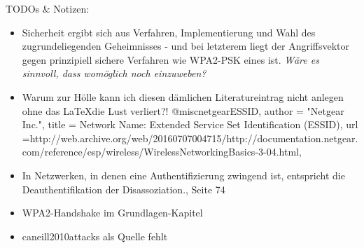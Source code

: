TODOs \& Notizen:
\begin{itemize}
	\item Sicherheit ergibt sich aus Verfahren, Implementierung und Wahl des zugrundeliegenden Geheimnisses - und bei letzterem liegt der Angriffsvektor gegen prinzipiell sichere Verfahren wie WPA2-PSK eines ist. \textit{Wäre es sinnvoll, dass womöglich noch einzuweben?}
	\item Warum zur Hölle kann ich diesen dämlichen Literatureintrag nicht anlegen ohne das \LaTeX die Lust verliert?! @misc{netgearESSID,
		author = "Netgear Inc.",
		title = {Network Name: Extended Service Set Identification (ESSID)},
		url ={http://web.archive.org/web/20160707004715/http://documentation.netgear.com/reference/esp/wireless/WirelessNetworkingBasics-3-04.html},
	}
	\item In Netzwerken, in denen eine Authentifizierung zwingend ist, entspricht die Deauthentifikation der Disassoziation., Seite 74
	\item WPA2-Handshake im Grundlagen-Kapitel
	\item caneill2010attacks als Quelle fehlt
\end{itemize}